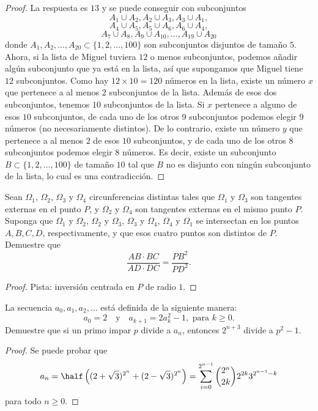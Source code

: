 \begin{proof}
  La respuesta es $13$ y se puede conseguir con subconjuntos
  \[A_1\cup A_2,A_2\cup A_3,A_3\cup A_1,\]
  \[A_4\cup A_5,A_5\cup A_6,A_6\cup A_4,\]
  \[A_7\cup A_8,A_9\cup A_{10},\dots,A_{19}\cup A_{20}\]
  donde $A_1,A_2,\dots,A_{20}\subset\{1,2,\dots,100\}$ son subconjuntos
  disjuntos de tamaño $5$. Ahora, si la lista de Miguel tuviera $12$ o menos
  subconjuntos, podemos añadir algún subconjunto que ya está en la lista, así
  que supongamos que Miguel tiene $12$ subconjuntos. Como hay $12\times 10=120$
  números en la lista, existe un número $x$ que pertenece a al menos $2$
  subconjuntos de la lista. Además de esos dos subconjuntos, tenemos $10$
  subconjuntos de la lista. Si $x$ pertenece a alguno de esos $10$ subconjuntos,
  de cada uno de los otros $9$ subconjuntos podemos elegir $9$ números (no
  necesariamente distintos). De lo contrario, existe un número $y$ que pertenece
  a al menos $2$ de esos $10$ subconjuntos, y de cada uno de los otros $8$
  subconjuntos podemos elegir $8$ números. Es decir, existe un subconjunto
  $B\subset\{1,2,\dots,100\}$ de tamaño $10$ tal que $B$ no es disjunto con
  ningún subconjunto de la lista, lo cual es una contradicción.
\end{proof}

\begin{probEG}
  Sean $\Omega_1$, $\Omega_2$, $\Omega_3$ y $\Omega_4$ circunferencias distintas
  tales que $\Omega_1$ y $\Omega_3$ son tangentes externas en el punto $P$, y
  $\Omega_2$ y $\Omega_4$ son tangentes externas en el mismo punto $P$. Suponga
  que $\Omega_1$ y $\Omega_2$, $\Omega_2$ y $\Omega_3$, $\Omega_3$ y $\Omega_4$,
  $\Omega_4$ y $\Omega_1$ se intersectan en los puntos $A,B,C,D$,
  respectivamente, y que esos cuatro puntos son distintos de $P$. Demuestre que
  \[\frac{AB\cdot BC}{AD\cdot DC}=\frac{PB^2}{PD^2}.\]
\end{probEG}

\begin{proof}
  Pista: inversión centrada en $P$ de radio $1$.
\end{proof}

\begin{probMR}
  La secuencia $a_0,a_1,a_2,\dots$ está definida de la siguiente manera:
  \[a_0=2\quad\text{y}\quad a_{k+1}=2a_k^2-1,\text{ para }k\ge 0.\]
  Demuestre que si un primo impar $p$ divide a $a_n$, entonces $2^{n+3}$ divide
  a $p^2-1$.
\end{probMR}

\begin{proof}
  Se puede probar que
  \[
    a_n
    =\half\left((2+\sqrt{3})^{2^n}+(2-\sqrt{3})^{2^n}\right)
    =\sum_{i=0}^{2^{n-1}}\binom{2^n}{2k}2^{2k}3^{2^{n-1}-k}
  \]
  para todo $n\ge 0$.
\end{proof}
